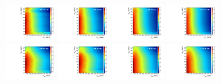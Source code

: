 \begin{figure}[htbp]
  \includegraphics[width=0.2\textwidth]{fig/analysis/template_nonRes_mu_HP_vbf_LDy.pdf}
  \includegraphics[width=0.2\textwidth]{fig/analysis/template_nonRes_e_HP_vbf_LDy.pdf}
  \includegraphics[width=0.2\textwidth]{fig/analysis/template_nonRes_mu_LP_vbf_LDy.pdf}
  \includegraphics[width=0.2\textwidth]{fig/analysis/template_nonRes_e_LP_vbf_LDy.pdf}\\
  \includegraphics[width=0.2\textwidth]{fig/analysis/template_nonRes_mu_HP_bb_HDy.pdf}
  \includegraphics[width=0.2\textwidth]{fig/analysis/template_nonRes_e_HP_bb_HDy.pdf}
  \includegraphics[width=0.2\textwidth]{fig/analysis/template_nonRes_mu_LP_bb_HDy.pdf}
  \includegraphics[width=0.2\textwidth]{fig/analysis/template_nonRes_e_LP_bb_HDy.pdf}\\

\end{figure}
